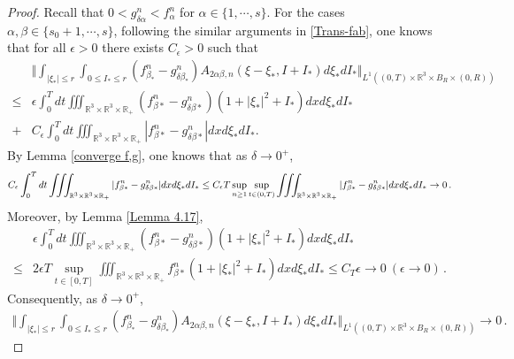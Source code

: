 \documentclass[reqno,11pt]{amsart}
\numberwithin{equation}{section}
\def\R{\mathbb{R}}
\begin{document}
\begin{proof}
Recall that $0 < g^n_{\delta \alpha} < f^n_\alpha$ for $\alpha \in \{ 1, \cdots, s \}$. For the cases $\alpha, \beta \in \{s_0+1,\cdots ,s\}$, following the similar arguments in \eqref{Trans-fab}, one knows that for all $\epsilon>0$ there exists $C_\epsilon >0$ such that
\begin{equation*}
	\begin{aligned}
		&\Vert \int_{|\xi_* |\leq r} \int_{0\leq I_* \leq r} (f^n_{ \beta_*} -g^n_{\delta \beta_*}) A_{2\alpha \beta ,n}(\xi -\xi_* ,I+I_* ) d\xi_* dI_* \Vert_{L^1((0,T)\times \R^3 \times B_R \times (0,R))} \\
		\leq & \epsilon \int_{0}^{T} dt \iiint_{\R^3 \times \R^3 \times \R_+} (f^n_{\beta *} -g^n_{\delta \beta * } ) (1+|\xi_*|^2+I_*) dx d\xi_* dI_* \\
		+&C_\epsilon  \int_{0}^{T} dt \iiint_{\R^3 \times \R^3 \times \R_+}| f^n_{\beta *} -g^n_{\delta \beta * } |dx d\xi_* dI_* .
	\end{aligned}
\end{equation*}
By Lemma \ref{converge f,g}, one knows that as $\delta \to 0^+$,
\begin{equation*}{\small
  \begin{aligned}
    C_\epsilon  \int_{0}^{T} dt \iiint_{\R^3 \times \R^3 \times \R_+}| f^n_{\beta *} -g^n_{\delta \beta * } |dx d\xi_* dI_* \leq C_\epsilon T \sup_{n \geq 1} \sup_{ t \in (0, T) } \iiint_{\R^3 \times \R^3 \times \R_+}| f^n_{\beta *} -g^n_{\delta \beta * } |dx d\xi_* dI_* \to 0 \,.
  \end{aligned}}
\end{equation*}
Moreover, by Lemma \ref{Lemma 4.17},
\begin{equation*}
  \begin{aligned}
    & \epsilon \int_{0}^{T} dt \iiint_{\R^3 \times \R^3 \times \R_+} (f^n_{\beta *} -g^n_{\delta \beta * } ) (1+|\xi_*|^2+I_*) dx d\xi_* dI_* \\
    \leq & 2 \epsilon T \sup_{ t \in [0, T] } \iiint_{\R^3 \times \R^3 \times \R_+} f^n_{\beta *} (1+|\xi_*|^2+I_*) dx d\xi_* dI_* \leq C_T \epsilon \to 0 \ (\epsilon \to 0) \,.
  \end{aligned}
\end{equation*}
Consequently, as $\delta \to 0^+$,
\begin{equation*}
  \begin{aligned}
    \Vert \int_{|\xi_* |\leq r} \int_{0\leq I_* \leq r} (f^n_{ \beta_*} -g^n_{\delta \beta_*}) A_{2\alpha \beta ,n}(\xi -\xi_* ,I+I_* ) d\xi_* dI_* \Vert_{L^1((0,T)\times \R^3 \times B_R \times (0,R))} \to 0 \,.

\end{aligned}
\end{equation*}
\end{proof}
\end{document}
